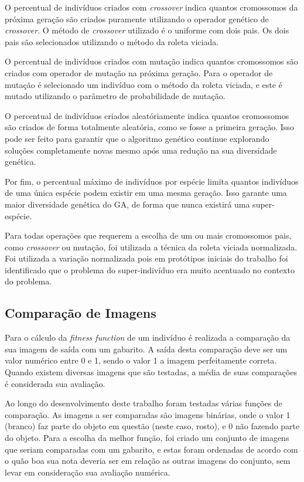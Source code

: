 \documentclass[12pt,oneside,a4paper,english,french,spanish,brazil,]{abntex2}
\begin{document}
O percentual de indivíduos criados com \textit{crossover} indica quantos cromossomos da próxima geração são criados puramente utilizando o operador genético de \textit{crossover}. O método de \textit{crossover} utilizado é o uniforme com dois pais. Os dois pais são selecionados utilizando o método da roleta viciada.

O percentual de indivíduos criados com mutação indica quantos cromossomos são criados com operador de mutação na próxima geração. Para o operador de mutação é selecionado um indivíduo com o método da roleta viciada, e este é mutado utilizando o parâmetro de probabilidade de mutação.

O percentual de indivíduos criados aleatóriamente indica quantos cromossomos são criados de forma totalmente aleatória, como se fosse a primeira geração. Isso pode ser feito para garantir que o algoritmo genético continue explorando soluções completamente novas mesmo após uma redução na sua diversidade genética.

Por fim, o percentual máximo de indivíduos por espécie limita quantos indivíduos de uma única espécie podem existir em uma mesma geração. Isso garante uma maior diversidade genética do GA, de forma que nunca existirá uma super-espécie.

Para todas operações que requerem a escolha de um ou mais cromossomos pais, como \textit{crossover} ou mutação, foi utilizada a técnica da roleta viciada normalizada. Foi utilizada a variação normalizada pois em protótipos iniciais do trabalho foi identificado que o problema do super-indivíduo era muito acentuado no contexto do problema.

\subsection{Comparação de Imagens}

Para o cálculo da \textit{fitness function} de um indivíduo é realizada a comparação da sua imagem de saída com um gabarito. A saída desta comparação deve ser um valor numérico entre 0 e 1, sendo o valor 1 a imagem perfeitamente correta. Quando existem diversas imagens que são testadas, a média de suas comparações é considerada sua avaliação.

Ao longo do desenvolvimento deste trabalho foram testadas várias funções de comparação. As imagens a ser comparadas são imagens binárias, onde o valor 1 (branco) faz parte do objeto em questão (neste caso, rosto), e 0 não fazendo parte do objeto. Para a escolha da melhor função, foi criado um conjunto de imagens que seriam comparadas com um gabarito, e estas foram ordenadas de acordo com o quão boa sua nota deveria ser em relação as outras imagens do conjunto, sem levar em consideração sua avaliação numérica.
\end{document}

